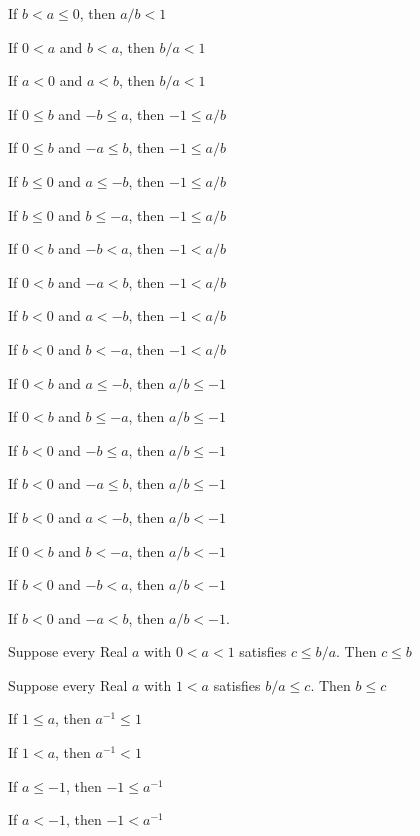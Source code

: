 \documentclass{article}
\let\xrbreak\medbreak
\begin{document}
\begin{thm}
\item\label{xreal1:190} If $b<a\leq0$, then $a/b<1$
\item\label{xreal1:191} If $0<a$ and $b<a$, then $b/a<1$
\item\label{xreal1:192} If $a<0$ and $a<b$, then $b/a<1$
  \xrbreak
\item\label{xreal1:193} If $0\leq b$ and $-b\leq a$, then $-1\leq a/b$
\item\label{xreal1:194} If $0\leq b$ and $-a\leq b$, then $-1\leq a/b$
\item\label{xreal1:195} If $b\leq0$ and $a\leq-b$, then $-1\leq a/b$
\item\label{xreal1:196} If $b\leq0$ and $b\leq-a$, then $-1\leq a/b$
\item\label{xreal1:197} If $0<b$ and $-b<a$, then $-1<a/b$
\item\label{xreal1:198} If $0<b$ and $-a<b$, then $-1<a/b$
\item\label{xreal1:199} If $b<0$ and $a<-b$, then $-1<a/b$
\item\label{xreal1:200} If $b<0$ and $b<-a$, then $-1<a/b$
\item\label{xreal1:201} If $0<b$ and $a\leq-b$, then $a/b\leq-1$
\item\label{xreal1:202} If $0<b$ and $b\leq-a$, then $a/b\leq-1$
\item\label{xreal1:203} If $b<0$ and $-b\leq a$, then $a/b\leq-1$
\item\label{xreal1:204} If $b<0$ and $-a\leq b$, then $a/b\leq-1$
\item\label{xreal1:205} If $b<0$ and $a<-b$, then $a/b<-1$
\item\label{xreal1:206} If $0<b$ and $b<-a$, then $a/b<-1$
\item\label{xreal1:207} If $b<0$ and $-b<a$, then $a/b<-1$
\item\label{xreal1:208} If $b<0$ and $-a<b$, then $a/b<-1$.
  \xrbreak
\item\label{xreal1:209} Suppose every Real $a$ with $0<a<1$ satisfies
  $c\leq b/a$. Then $c\leq b$
\item\label{xreal1:210} Suppose every Real $a$ with $1<a$ satisfies
  $b/a\leq c$. Then $b\leq c$
\item\label{xreal1:211} If $1\leq a$, then $a^{-1}\leq1$
\item\label{xreal1:212} If $1<a$, then $a^{-1}<1$
\item\label{xreal1:213} If $a\leq-1$, then $-1\leq a^{-1}$
\item\label{xreal1:214} If $a<-1$, then $-1<a^{-1}$

\end{thm}
\end{document}

